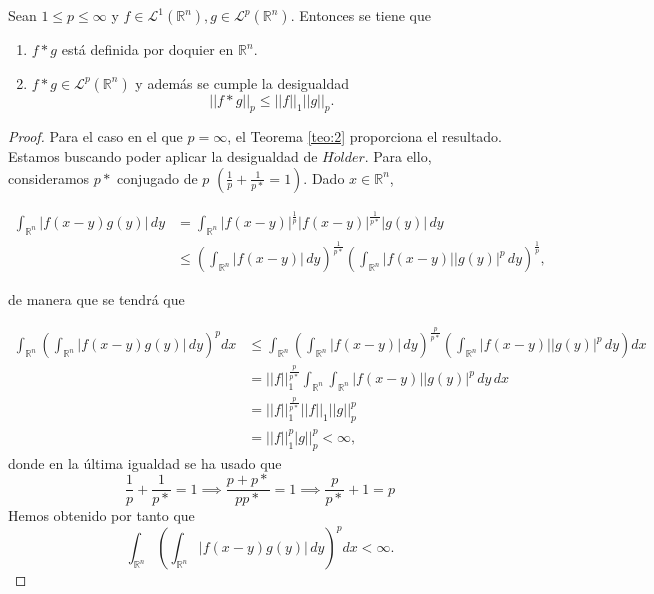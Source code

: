 \begin{teorema}\label{teo:conv2}
Sean $1 \leq p \leq \infty$ y $f\in \mathscr{L}^1(\mathbb{R}^n), g\in \mathscr{L}^p(\mathbb{R}^n)$. Entonces se tiene que 
\begin{enumerate}[itemsep=0.5ex,parsep=0pt,topsep=0pt,partopsep=0pt]
    \item $f*g$ está definida por doquier en $\mathbb{R}^n$.
    \item $f*g \in \mathscr{L}^p(\mathbb{R}^n)$ y además se cumple la desigualdad
    \begin{equation}
        ||f*g||_p \leq ||f||_1 ||g||_p.
    \end{equation}  
\end{enumerate}
\end{teorema}

\begin{proof}
Para el caso en el que $p = \infty$, el Teorema \ref{teo:2} proporciona el resultado. 
Estamos buscando poder aplicar la desigualdad de $H\ddot{o}lder$. Para ello, consideramos $p*$ conjugado de $p$ $(\frac{1}{p}+\frac{1}{p*}=1)$. Dado $x \in \mathbb{R}^n$,

\begin{equation}
\begin{aligned}
   \int_{\mathbb{R}^n}|f(x-y)g(y)|\,dy &= \int_{\mathbb{R}^n}|f(x-y)|^{\frac{1}{p}}|f(x-y)|^{\frac{1}{p*}}|g(y)|\,dy\\
    &\leq  \left(\int_{\mathbb{R}^n}|f(x-y)| \, dy \right)^{\frac{1}{p*}} \left(\int_{\mathbb{R}^n}|f(x-y)||g(y)|^p \, dy \right)^{\frac{1}{p}},
\end{aligned}
\end{equation}


de manera que se tendrá que

\begin{equation}
\begin{aligned}
    \int_{\mathbb{R}^n}\left(\int_{\mathbb{R}^n} |f(x-y)g(y)| \, dy\right)^p  dx  &\leq \int_{\mathbb{R}^n}\left(\int_{\mathbb{R}^n}|f(x-y)| \, dy \right)^{\frac{p}{p*}} \left(\int_{\mathbb{R}^n}|f(x-y)||g(y)|^p \,dy \right)dx\\
    &=
    ||f||_{1}^{\frac{p}{p*}}\int_{\mathbb{R}^n}\int_{\mathbb{R}^n}|f(x-y)||g(y)|^p \, dy \, dx
    \\
    &=  ||f||_{1}^{\frac{p}{p*}}||f||_1||g||_{p}^{p} \\
    &=  ||f||_{1}^{p}|g||_{p}^{p} < \infty,
\end{aligned}
\end{equation}
donde en la última igualdad se ha usado que 
\begin{equation}
    \frac{1}{p}+\frac{1}{p*} = 1 \implies \frac{p+p*}{pp*}=1 \implies\frac{p}{p*}+1 = p
\end{equation}
Hemos obtenido por tanto que 
\begin{equation}
    \int_{\mathbb{R}^n}\left(\int_{\mathbb{R}^n} |f(x-y)g(y)| \, dy\right)^p  dx <  \infty.
\end{equation}


\end{proof}

